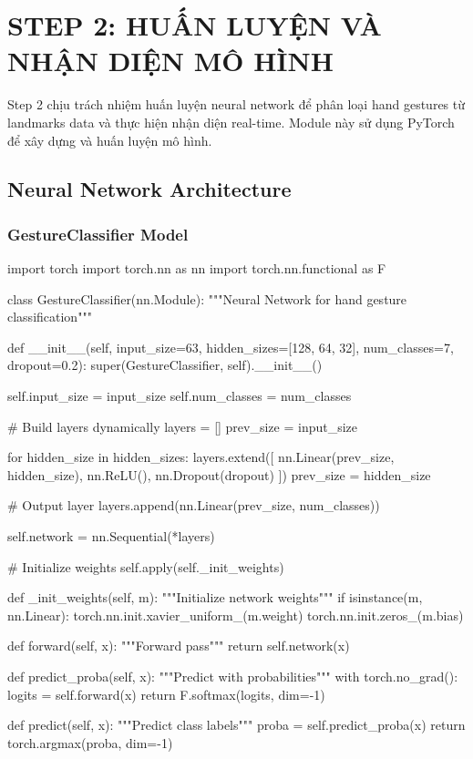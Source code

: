 \section{STEP 2: HUẤN LUYỆN VÀ NHẬN DIỆN MÔ HÌNH}

Step 2 chịu trách nhiệm huấn luyện neural network để phân loại hand gestures từ landmarks data và thực hiện nhận diện real-time. Module này sử dụng PyTorch để xây dựng và huấn luyện mô hình.

\subsection{Neural Network Architecture}

\subsubsection{GestureClassifier Model}

\begin{aivncodebox}
\begin{python}
import torch
import torch.nn as nn
import torch.nn.functional as F

class GestureClassifier(nn.Module):
    """Neural Network for hand gesture classification"""
    
    def __init__(self, input_size=63, hidden_sizes=[128, 64, 32], 
                 num_classes=7, dropout=0.2):
        super(GestureClassifier, self).__init__()
        
        self.input_size = input_size
        self.num_classes = num_classes
        
        # Build layers dynamically
        layers = []
        prev_size = input_size
        
        for hidden_size in hidden_sizes:
            layers.extend([
                nn.Linear(prev_size, hidden_size),
                nn.ReLU(),
                nn.Dropout(dropout)
            ])
            prev_size = hidden_size
        
        # Output layer
        layers.append(nn.Linear(prev_size, num_classes))
        
        self.network = nn.Sequential(*layers)
        
        # Initialize weights
        self.apply(self._init_weights)
    
    def _init_weights(self, m):
        """Initialize network weights"""
        if isinstance(m, nn.Linear):
            torch.nn.init.xavier_uniform_(m.weight)
            torch.nn.init.zeros_(m.bias)
    
    def forward(self, x):
        """Forward pass"""
        return self.network(x)
    
    def predict_proba(self, x):
        """Predict with probabilities"""
        with torch.no_grad():
            logits = self.forward(x)
            return F.softmax(logits, dim=-1)
    
    def predict(self, x):
        """Predict class labels"""
        proba = self.predict_proba(x)
        return torch.argmax(proba, dim=-1)
\end{python}
\end{aivncodebox}

